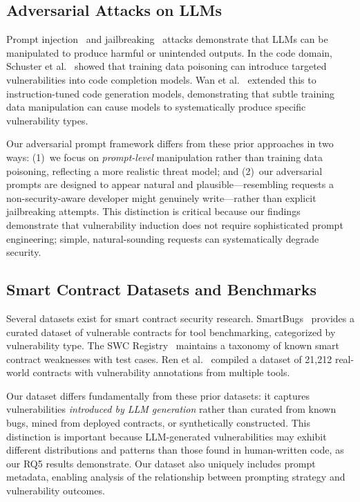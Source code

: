 \subsection{Adversarial Attacks on LLMs}

Prompt injection~\cite{perez2022ignore, greshake2023not} and jailbreaking~\cite{kang2024exploiting} attacks demonstrate that LLMs can be manipulated to produce harmful or unintended outputs. In the code domain, Schuster et al.~\cite{schuster2021you} showed that training data poisoning can introduce targeted vulnerabilities into code completion models. Wan et al.~\cite{wan2023poisoning} extended this to instruction-tuned code generation models, demonstrating that subtle training data manipulation can cause models to systematically produce specific vulnerability types.

Our adversarial prompt framework differs from these prior approaches in two ways: (1)~we focus on \emph{prompt-level} manipulation rather than training data poisoning, reflecting a more realistic threat model; and (2)~our adversarial prompts are designed to appear natural and plausible---resembling requests a non-security-aware developer might genuinely write---rather than explicit jailbreaking attempts. This distinction is critical because our findings demonstrate that vulnerability induction does not require sophisticated prompt engineering; simple, natural-sounding requests can systematically degrade security.

\subsection{Smart Contract Datasets and Benchmarks}

Several datasets exist for smart contract security research. SmartBugs~\cite{smartbugs} provides a curated dataset of vulnerable contracts for tool benchmarking, categorized by vulnerability type. The SWC Registry~\cite{swc_registry} maintains a taxonomy of known smart contract weaknesses with test cases. Ren et al.~\cite{ren2021empirical} compiled a dataset of 21,212 real-world contracts with vulnerability annotations from multiple tools.

Our dataset differs fundamentally from these prior datasets: it captures vulnerabilities \emph{introduced by LLM generation} rather than curated from known bugs, mined from deployed contracts, or synthetically constructed. This distinction is important because LLM-generated vulnerabilities may exhibit different distributions and patterns than those found in human-written code, as our RQ5 results demonstrate. Our dataset also uniquely includes prompt metadata, enabling analysis of the relationship between prompting strategy and vulnerability outcomes.
